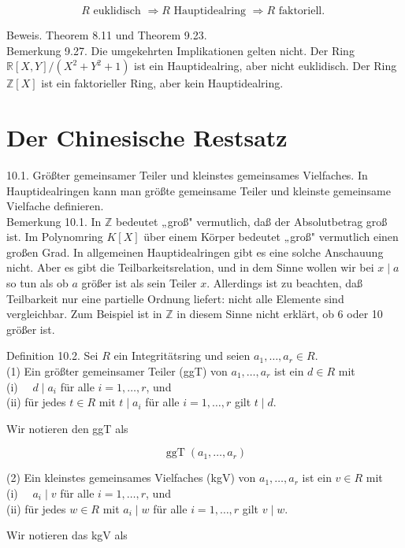\documentclass[10pt, letterpaper]{article}
\begin{document}
$$
R \text { euklidisch } \Longrightarrow R \text { Hauptidealring } \Longrightarrow R \text { faktoriell. }
$$

Beweis. Theorem 8.11 und Theorem 9.23.\\
Bemerkung 9.27. Die umgekehrten Implikationen gelten nicht. Der Ring $\mathbb{R}[X, Y] /\left(X^{2}+Y^{2}+1\right)$ ist ein Hauptidealring, aber nicht euklidisch. Der Ring $\mathbb{Z}[X]$ ist ein faktorieller Ring, aber kein Hauptidealring.

\section*{Der Chinesische Restsatz}
10.1. Größter gemeinsamer Teiler und kleinstes gemeinsames Vielfaches. In Hauptidealringen kann man größte gemeinsame Teiler und kleinste gemeinsame Vielfache definieren.\\
Bemerkung 10.1. In $\mathbb{Z}$ bedeutet „groß" vermutlich, daß der Absolutbetrag groß ist. Im Polynomring $K[X]$ über einem Körper bedeutet „groß" vermutlich einen großen Grad. In allgemeinen Hauptidealringen gibt es eine solche Anschauung nicht. Aber es gibt die Teilbarkeitsrelation, und in dem Sinne wollen wir bei $x \mid a$ so tun als ob $a$ größer ist als sein Teiler $x$. Allerdings ist zu beachten, daß Teilbarkeit nur eine partielle Ordnung liefert: nicht alle Elemente sind vergleichbar. Zum Beispiel ist in $\mathbb{Z}$ in diesem Sinne nicht erklärt, ob 6 oder 10 größer ist.

Definition 10.2. Sei $R$ ein Integritätsring und seien $a_{1}, \ldots, a_{r} \in R$.\\
(1) Ein größter gemeinsamer Teiler (ggT) von $a_{1}, \ldots, a_{r}$ ist ein $d \in R$ mit\\
(i) $\quad d \mid a_{i}$ für alle $i=1, \ldots, r$, und\\
(ii) für jedes $t \in R$ mit $t \mid a_{i}$ für alle $i=1, \ldots, r$ gilt $t \mid d$.

Wir notieren den ggT als

$$
\operatorname{ggT}\left(a_{1}, \ldots, a_{r}\right)
$$

(2) Ein kleinstes gemeinsames Vielfaches (kgV) von $a_{1}, \ldots, a_{r}$ ist ein $v \in R$ mit\\
(i) $\quad a_{i} \mid v$ für alle $i=1, \ldots, r$, und\\
(ii) für jedes $w \in R$ mit $a_{i} \mid w$ für alle $i=1, \ldots, r$ gilt $v \mid w$.

Wir notieren das kgV als
\end{document}
